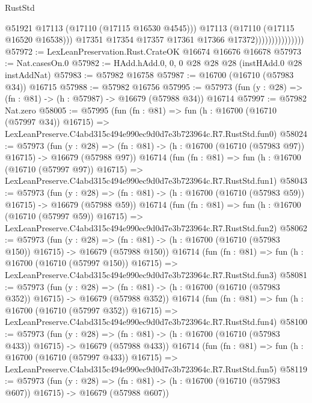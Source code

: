 \begin{lexlean}{RustStd}
\begin{coremodule}
                                      @51921
                                      @17113
                                      (@17110 (@17115 @16530 @4545)))
                                    @17113
                                    (@17110 (@17115 @16520 @16538)))
                                  @17351
                                  @17354
                                  @17357
                                  @17361
                                  @17366
                                  @17372)))))))))))))))
@57972 := LexLeanPreservation.Rust.CrateOK @16674 @16676 @16678
@57973 := Nat.casesOn.{0}
@57982 := HAdd.hAdd.{0, 0, 0} @28 @28 @28 (instHAdd.{0} @28 instAddNat)
@57983 := @57982 @16758
@57987 := @16700 (@16710 (@57983 @34)) @16715
@57988 := @57982 @16756
@57995 := @57973 (fun (y : @28) => (fn : @81) -> (h : @57987) -> @16679 (@57988 @34)) @16714
@57997 := @57982 Nat.zero
@58005 := @57995
    (fun (fn : @81) =>
    fun (h : @16700 (@16710 (@57997 @34)) @16715) =>
    LexLeanPreserve.C4abd315c494e990ec9d0d7e3b723964c.R7.RustStd.fun0)
@58024 := @57973
    (fun (y : @28) =>
    (fn : @81) -> (h : @16700 (@16710 (@57983 @97)) @16715) -> @16679 (@57988 @97))
    @16714
    (fun (fn : @81) =>
    fun (h : @16700 (@16710 (@57997 @97)) @16715) =>
    LexLeanPreserve.C4abd315c494e990ec9d0d7e3b723964c.R7.RustStd.fun1)
@58043 := @57973
    (fun (y : @28) =>
    (fn : @81) -> (h : @16700 (@16710 (@57983 @59)) @16715) -> @16679 (@57988 @59))
    @16714
    (fun (fn : @81) =>
    fun (h : @16700 (@16710 (@57997 @59)) @16715) =>
    LexLeanPreserve.C4abd315c494e990ec9d0d7e3b723964c.R7.RustStd.fun2)
@58062 := @57973
    (fun (y : @28) =>
    (fn : @81) -> (h : @16700 (@16710 (@57983 @150)) @16715) -> @16679 (@57988 @150))
    @16714
    (fun (fn : @81) =>
    fun (h : @16700 (@16710 (@57997 @150)) @16715) =>
    LexLeanPreserve.C4abd315c494e990ec9d0d7e3b723964c.R7.RustStd.fun3)
@58081 := @57973
    (fun (y : @28) =>
    (fn : @81) -> (h : @16700 (@16710 (@57983 @352)) @16715) -> @16679 (@57988 @352))
    @16714
    (fun (fn : @81) =>
    fun (h : @16700 (@16710 (@57997 @352)) @16715) =>
    LexLeanPreserve.C4abd315c494e990ec9d0d7e3b723964c.R7.RustStd.fun4)
@58100 := @57973
    (fun (y : @28) =>
    (fn : @81) -> (h : @16700 (@16710 (@57983 @433)) @16715) -> @16679 (@57988 @433))
    @16714
    (fun (fn : @81) =>
    fun (h : @16700 (@16710 (@57997 @433)) @16715) =>
    LexLeanPreserve.C4abd315c494e990ec9d0d7e3b723964c.R7.RustStd.fun5)
@58119 := @57973
    (fun (y : @28) =>
    (fn : @81) -> (h : @16700 (@16710 (@57983 @607)) @16715) -> @16679 (@57988 @607))

\end{coremodule}
\end{lexlean}
